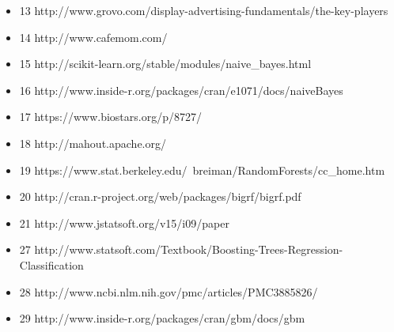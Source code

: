 \documentclass[a4paper]{article}
\begin{document}
\begin{itemize}
  \item 13 http://www.grovo.com/display-advertising-fundamentals/the-key-players
  \item 14 http://www.cafemom.com/
  \item 15 http://scikit-learn.org/stable/modules/naive\_bayes.html
  \item 16 http://www.inside-r.org/packages/cran/e1071/docs/naiveBayes
  \item 17 https://www.biostars.org/p/8727/
  \item 18 http://mahout.apache.org/
  \item 19 https://www.stat.berkeley.edu/~breiman/RandomForests/cc\_home.htm
  \item 20 http://cran.r-project.org/web/packages/bigrf/bigrf.pdf
  \item 21 http://www.jstatsoft.org/v15/i09/paper
  \item 27 http://www.statsoft.com/Textbook/Boosting-Trees-Regression-Classification
  \item 28 http://www.ncbi.nlm.nih.gov/pmc/articles/PMC3885826/
  \item 29 http://www.inside-r.org/packages/cran/gbm/docs/gbm
\end{itemize}
\end{document}
